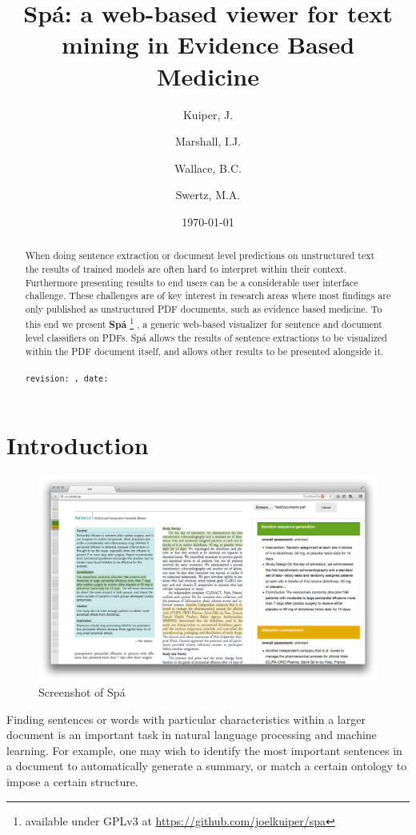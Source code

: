 \documentclass[runningheads,a4paper]{llncs}
\institute{University of Groningen \and Kings College London \and Brown University}
\author{Kuiper, J\inst{1}. \and Marshall, I.J.\inst{2} \and Wallace, B.C.\inst{3} \and Swertz, M.A.\inst{1}}
\date{\today}
\title{Spá: a web-based viewer for text mining in Evidence Based Medicine}
\begin{document}
\maketitle
\begin{abstract}
When doing sentence extraction or document level predictions on unstructured text the results of trained models are often hard to interpret within their context.
Furthermore presenting results to end users can be a considerable user interface challenge.
These challenges are of key interest in research areas where most findings are only published as unstructured PDF documents, such as evidence based medicine.
To this end we present \textbf{Spá} \footnote{available under GPLv3 at \url{https://github.com/joelkuiper/spa}} \cite{kuiper2014}, a generic web-based visualizer for sentence and document level classifiers on PDFs.
Spá allows the results of sentence extractions to be visualized within the PDF document itself, and allows other results to be presented alongside it.
\\
\\
\texttt{revision: \revision, date: \revisiondate}
\end{abstract}

\section{Introduction}
\label{sec-1}
\begin{figure}[htb]
\centering
\includegraphics[width=.9\linewidth]{./screenshot.png}
\caption{Screenshot of Spá}
\end{figure}

Finding sentences or words with particular characteristics within a larger document is an important task in natural language processing and machine learning.
For example, one may wish to identify the most important sentences in a document to automatically generate a summary, or match a certain ontology to impose a certain structure.
\end{document}
